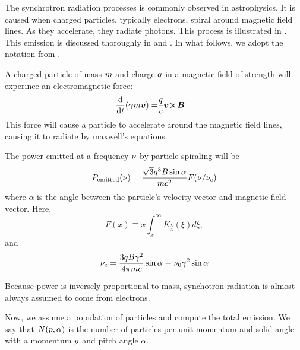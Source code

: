 The synchrotron radiation processes is commonly observed in
astrophysics. It is caused when charged particles, typically
electrons, spiral around magnetic field lines.  As they
accelerate, they radiate photons.  This process is illustrated in
.
This emission is discussed thoroughly in
\cite{blumenthal_1970a_bremsstrahlung-synchrotron} and
\cite{rybicki_1979a_radiative-processes}.
In what follows, we adopt the notation from
\cite{houck_2006a_models-nonthermal}.

A charged particle of 
mass $m$ and charge $q$ in a magnetic field
of strength 
\MagneticFieldVector
will experince an
electromagnetic force:
\begin{align}
  \frac{\text{d}}{\text{d}t} (\gamma m \boldsymbol{v}) = & \frac{q}{c} \boldsymbol{v}\!\boldsymbol{\times}\!\boldsymbol{B}
\end{align}
This force will cause a particle to accelerate around
the magnetic field lines, causing it
to radiate by maxwell's equations.

The power emitted at a frequency $\nu$ 
by particle spiraling will be
\begin{equation}
  \eqnlabel{power_emitted_particle_sync}
  \power_\text{emitted}(\frequency) = 
  \frac{\sqrt{3} \charge^3 B \sin\alpha}{\mass \speedoflight^2} F(\frequency/\frequency_c)
\end{equation}
where $\alpha$ is the angle between the particle's velocity vector and
magnetic field vector.
Here,
\begin{equation}
  F(x) \equiv x \int_x^\infty K_{\tfrac{5}{3}} (\xi) d\xi,
\end{equation}
and
\begin{equation}
\nu_c = \frac{3q B \gamma^2}{4\pi m c} 
\sin\alpha \equiv \nu_0 \gamma^2 \sin\alpha
\end{equation}

Because power is inversely-proportional to mass, synchotron radiation
is almost always assumed to come from electrons.

Now, we assume a population of particles and compute the total
emission. We say that $N(p,\alpha)$ is the number of particles
per unit momentum and solid angle with a momentum $p$ and
pitch angle $\alpha$.

